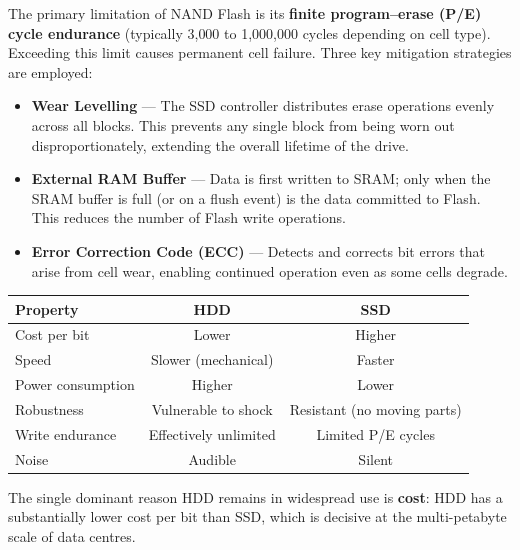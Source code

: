 \documentclass[11pt, a4paper, notitlepage]{report}
\theoremstyle{definition}
\theoremstyle{remark}
\theoremstyle{definition}
\begin{document}
The primary limitation of NAND Flash is its \textbf{finite program–erase (P/E) cycle endurance} (typically 3{,}000 to 1{,}000{,}000 cycles depending on cell type). Exceeding this limit causes permanent cell failure. Three key mitigation strategies are employed:

\begin{itemize}
  \item \textbf{Wear Levelling} — The SSD controller distributes erase operations evenly across all blocks. This prevents any single block from being worn out disproportionately, extending the overall lifetime of the drive.
  \item \textbf{External RAM Buffer} — Data is first written to SRAM; only when the SRAM buffer is full (or on a flush event) is the data committed to Flash. This reduces the number of Flash write operations.
  \item \textbf{Error Correction Code (ECC)} — Detects and corrects bit errors that arise from cell wear, enabling continued operation even as some cells degrade.
\end{itemize}

\begin{keyresult}[title={Key Result: HDD vs.\ SSD Trade-offs}]
  \begin{center}
  \renewcommand{\arraystretch}{1.3}
  \begin{tabular}{lcc}
    \toprule
    \textbf{Property} & \textbf{HDD} & \textbf{SSD} \\
    \midrule
    Cost per bit       & Lower & Higher \\
    Speed              & Slower (mechanical) & Faster \\
    Power consumption  & Higher & Lower \\
    Robustness         & Vulnerable to shock & Resistant (no moving parts) \\
    Write endurance    & Effectively unlimited & Limited P/E cycles \\
    Noise              & Audible & Silent \\
    \bottomrule
  \end{tabular}
  \end{center}
  The single dominant reason HDD remains in widespread use is \textbf{cost}: HDD has a substantially lower cost per bit than SSD, which is decisive at the multi-petabyte scale of data centres.
\end{keyresult}

\end{document}
